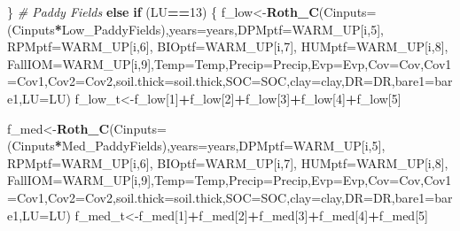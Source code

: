 \documentclass[
  10pt,
  b5paper,
]{book}
\newenvironment{Shaded}{\begin{snugshade}}{\end{snugshade}}
\newcommand{\CommentTok}[1]{\textcolor[rgb]{0.56,0.35,0.01}{\textit{#1}}}
\newcommand{\ControlFlowTok}[1]{\textcolor[rgb]{0.13,0.29,0.53}{\textbf{#1}}}
\newcommand{\DataTypeTok}[1]{\textcolor[rgb]{0.13,0.29,0.53}{#1}}
\newcommand{\DecValTok}[1]{\textcolor[rgb]{0.00,0.00,0.81}{#1}}
\newcommand{\KeywordTok}[1]{\textcolor[rgb]{0.13,0.29,0.53}{\textbf{#1}}}
\newcommand{\NormalTok}[1]{#1}
\newcommand{\OperatorTok}[1]{\textcolor[rgb]{0.81,0.36,0.00}{\textbf{#1}}}
\begin{document}
\begin{Shaded}
\begin{Highlighting}[]
\NormalTok{\}}
\CommentTok{# Paddy Fields }
\ControlFlowTok{else} \ControlFlowTok{if}\NormalTok{ (LU}\OperatorTok{==}\DecValTok{13}\NormalTok{) \{}
\NormalTok{f_low<-}\KeywordTok{Roth_C}\NormalTok{(}\DataTypeTok{Cinputs=}\NormalTok{(Cinputs}\OperatorTok{*}\NormalTok{Low_PaddyFields),}\DataTypeTok{years=}\NormalTok{years,}\DataTypeTok{DPMptf=}\NormalTok{WARM_UP[i,}\DecValTok{5}\NormalTok{], }\DataTypeTok{RPMptf=}\NormalTok{WARM_UP[i,}\DecValTok{6}\NormalTok{], }\DataTypeTok{BIOptf=}\NormalTok{WARM_UP[i,}\DecValTok{7}\NormalTok{], }\DataTypeTok{HUMptf=}\NormalTok{WARM_UP[i,}\DecValTok{8}\NormalTok{], }\DataTypeTok{FallIOM=}\NormalTok{WARM_UP[i,}\DecValTok{9}\NormalTok{],}\DataTypeTok{Temp=}\NormalTok{Temp,}\DataTypeTok{Precip=}\NormalTok{Precip,}\DataTypeTok{Evp=}\NormalTok{Evp,}\DataTypeTok{Cov=}\NormalTok{Cov,}\DataTypeTok{Cov1=}\NormalTok{Cov1,}\DataTypeTok{Cov2=}\NormalTok{Cov2,}\DataTypeTok{soil.thick=}\NormalTok{soil.thick,}\DataTypeTok{SOC=}\NormalTok{SOC,}\DataTypeTok{clay=}\NormalTok{clay,}\DataTypeTok{DR=}\NormalTok{DR,}\DataTypeTok{bare1=}\NormalTok{bare1,}\DataTypeTok{LU=}\NormalTok{LU)}
\NormalTok{f_low_t<-f_low[}\DecValTok{1}\NormalTok{]}\OperatorTok{+}\NormalTok{f_low[}\DecValTok{2}\NormalTok{]}\OperatorTok{+}\NormalTok{f_low[}\DecValTok{3}\NormalTok{]}\OperatorTok{+}\NormalTok{f_low[}\DecValTok{4}\NormalTok{]}\OperatorTok{+}\NormalTok{f_low[}\DecValTok{5}\NormalTok{]}

\NormalTok{f_med<-}\KeywordTok{Roth_C}\NormalTok{(}\DataTypeTok{Cinputs=}\NormalTok{(Cinputs}\OperatorTok{*}\NormalTok{Med_PaddyFields),}\DataTypeTok{years=}\NormalTok{years,}\DataTypeTok{DPMptf=}\NormalTok{WARM_UP[i,}\DecValTok{5}\NormalTok{], }\DataTypeTok{RPMptf=}\NormalTok{WARM_UP[i,}\DecValTok{6}\NormalTok{], }\DataTypeTok{BIOptf=}\NormalTok{WARM_UP[i,}\DecValTok{7}\NormalTok{], }\DataTypeTok{HUMptf=}\NormalTok{WARM_UP[i,}\DecValTok{8}\NormalTok{], }\DataTypeTok{FallIOM=}\NormalTok{WARM_UP[i,}\DecValTok{9}\NormalTok{],}\DataTypeTok{Temp=}\NormalTok{Temp,}\DataTypeTok{Precip=}\NormalTok{Precip,}\DataTypeTok{Evp=}\NormalTok{Evp,}\DataTypeTok{Cov=}\NormalTok{Cov,}\DataTypeTok{Cov1=}\NormalTok{Cov1,}\DataTypeTok{Cov2=}\NormalTok{Cov2,}\DataTypeTok{soil.thick=}\NormalTok{soil.thick,}\DataTypeTok{SOC=}\NormalTok{SOC,}\DataTypeTok{clay=}\NormalTok{clay,}\DataTypeTok{DR=}\NormalTok{DR,}\DataTypeTok{bare1=}\NormalTok{bare1,}\DataTypeTok{LU=}\NormalTok{LU)}
\NormalTok{f_med_t<-f_med[}\DecValTok{1}\NormalTok{]}\OperatorTok{+}\NormalTok{f_med[}\DecValTok{2}\NormalTok{]}\OperatorTok{+}\NormalTok{f_med[}\DecValTok{3}\NormalTok{]}\OperatorTok{+}\NormalTok{f_med[}\DecValTok{4}\NormalTok{]}\OperatorTok{+}\NormalTok{f_med[}\DecValTok{5}\NormalTok{]}


\end{Highlighting}
\end{Shaded}
\end{document}
